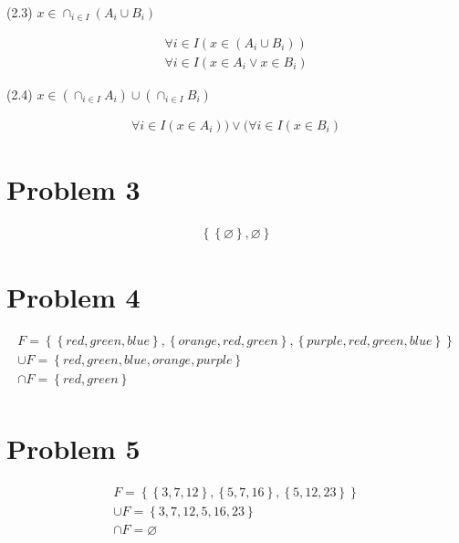 \documentclass{article}
\begin{document}
\begin{center}
(2.3) $ x \in \cap_{i \in I}(A_i \cup B_i)$ 
\end{center}
\begin{align*}
\forall i \in I(x \in (A_i \cup B_i)) \\
\forall i \in I(x \in A_i \lor x \in B_i)
\end{align*}

\begin{center}
(2.4) $x \in (\cap_{i \in I}A_i) \cup (\cap_{i \in I}B_i)$ 
\end{center}
\begin{align*}
\forall i \in I(x \in A_i)) \lor (\forall i \in I(x \in B_i)
\end{align*}

\section{Problem 3}
\begin{align*}
  \left\{\left\{\varnothing\right\}, \varnothing \right\}
\end{align*}

\section{Problem 4}
\begin{align*}
  F = \left\{ \left\{red, green, blue \right\}, \left\{orange, red,
  green\right\}, \left\{purple, red, green, blue \right\} \right\} \\
  \cup F = \left\{ red, green, blue, orange, purple\right\} \\
  \cap F = \left\{ red, green\right\} \\
\end{align*}

\section{Problem 5}
\begin{align*}
  F = \left\{ \left\{3,7,12 \right\}, \left\{5,7,16
  \right\}, \left\{5,12,23 \right\} \right\} \\
  \cup F = \left\{ 3,7,12,5,16,23 \right\} \\
  \cap F = \varnothing \\
\end{align*}
\end{document}

